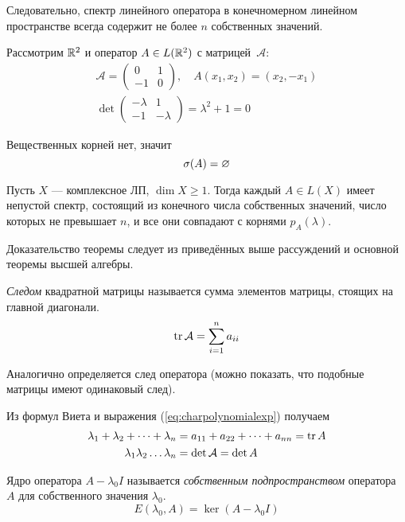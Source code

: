 Следовательно, спектр линейного оператора в конечномерном линейном пространстве
всегда содержит не более $n$ собственных значений.
\begin{example}
    Рассмотрим $\mathbb{R}^2$ и оператор $A \in L(\mathbb{R}^2)$ с матрицей~$\mathcal{A}$:
    \begin{gather*}
        \mathcal{A} = \begin{pmatrix}
                0 & 1 \\
                -1 & 0
        \end{pmatrix}, \quad
        A(x_1, x_2) = (x_2, -x_1) \\
        \det \begin{pmatrix}
                -\lambda & 1 \\
                -1 & -\lambda
        \end{pmatrix} = \lambda^2 + 1 = 0
    \end{gather*}

    Вещественных корней нет, значит
    \[ \operatorname{\sigma}(A) = \varnothing \]
\end{example}

\begin{theorem} \label{th:complexspectrum}
    Пусть $X$ — комплексное ЛП, $\dim X \geq 1$. Тогда каждый $A\in L(X)$ имеет
    непустой спектр, состоящий из конечного числа собственных значений, число
    которых не превышает $n$, и все они совпадают с корнями $p_A(\lambda)$.
\end{theorem}

Доказательство теоремы следует из приведённых выше рассуждений и основной
теоремы высшей алгебры.

\begin{definition}
    \emph{Следом} квадратной матрицы называется сумма элементов матрицы,
    стоящих на главной диагонали.
    \[ \operatorname{tr} \mathcal{A} = \sum_{i=1}^n a_{ii} \] 
\end{definition}

Аналогично определяется след оператора (можно показать, что подобные матрицы
имеют одинаковый след).

Из формул Виета и выражения (\ref{eq:charpolynomialexp}) получаем
\begin{align*}
    \lambda_1 + \lambda_2 + \dots + \lambda_n &= a_{11} + a_{22} + \dots +
    a_{nn} = \operatorname{tr} A \\
    \lambda_1 \lambda_2 \dots \lambda_n &= \det \mathcal{A} = \det A
\end{align*}

\begin{definition}
    Ядро оператора $A - \lambda_0 I$ называется \emph{собственным
    подпространством} оператора $A$ для собственного значения $\lambda_0$.
    \[ E(\lambda_0, A) = \ker (A - \lambda_0 I) \]
\end{definition}

